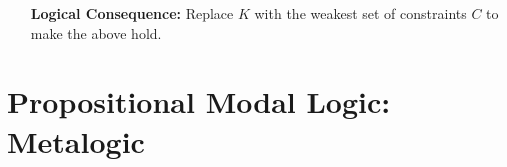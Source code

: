 \documentclass[a4paper, 11pt]{article} %
\begin{document}
\begin{enumerate}[leftmargin=1.2in,itemsep=1pt]
\begin{enumerate}[label=\arabic*.,resume]
    \end{enumerate}
	\item[\bf Logical Consequence:] Replace $K$ with the weakest set of constraints $C$ to make the above hold. 
\end{enumerate}




\section*{\sc Propositional Modal Logic: Metalogic}
\end{document}
